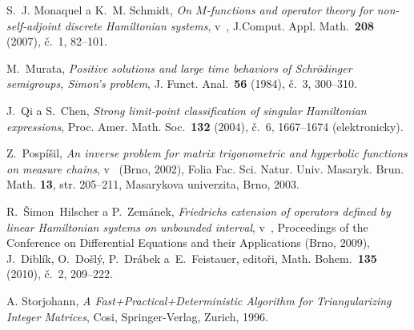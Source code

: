 \begin{thebibliography}{10}

S.~J. Monaquel a K.~M. Schmidt, \textit{On $M$-functions and operator
  theory for non-self-adjoint discrete Hamiltonian systems}, v~, J.Comput. Appl.
  Math.~\textbf{208} (2007), \v{c}.~1, 82--101.

M.~Murata, \textit{Positive solutions and large time behaviors of
  Schrödinger semigroups, Simon's problem}, J. Funct. Anal.~\textbf{56}
  (1984), č.~3, 300--310.

J.~Qi a S.~Chen, \textit{Strong limit-point classification of singular
  Hamiltonian expressions}, Proc. Amer. Math. Soc.~\textbf{132} (2004),
  č.~6, 1667--1674 (elektronicky).

Z.~Pospíšil, \textit{An inverse problem for matrix trigonometric and
  hyperbolic functions on measure chains}, v~ (Brno, 2002), Folia Fac.
  Sci. Natur. Univ. Masaryk. Brun. Math. {\bf 13}, str. 205--211, Masarykova
  univerzita, Brno, 2003.

R.~Šimon~Hilscher a P.~Zemánek, \textit{Friedrichs extension of
  operators defined by linear Hamiltonian systems on unbounded interval},
  v~, Proceedings of the Conference on Differential Equations and
  their Applications (Brno, 2009), J.~Diblík, O.~Došlý, P.~Drábek
  a~E.~Feistauer, editoři, Math. Bohem.~\textbf{135} (2010),
  č.~2, 209--222.

A. Storjohann, \textit{A Fast+Practical+Deterministic Algorithm for Triangularizing Integer Matrices},
Cosi, Springer-Verlag, Zurich, 1996.
\end{thebibliography}

\cleardoublepage
